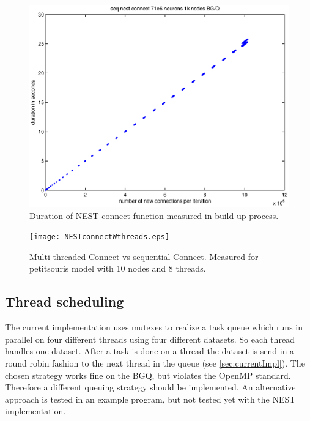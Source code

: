 \documentclass[a4paper]{article}
\begin{document}
\begin{figure}[h]
\centering
\includegraphics[scale=0.5]{seq_nest_conncet_1k.eps}
	\caption{Duration of NEST connect function measured in build-up process.}
	\label{Mikesformatcon}
\end{figure}

\begin{figure}[h]
\centering
\texttt{[image: NESTconnectWthreads.eps]}
	\caption{Multi threaded Connect vs sequential Connect.
	Measured for petitsouris model with 10 nodes and 8 threads.}
	\label{Mikesformatcon}
\end{figure}


\subsection{Thread scheduling}
The current implementation uses mutexes to realize a task queue which runs in parallel on four different threads using four different datasets. So each thread handles one dataset. After a task is done on a thread the dataset is send in a round robin fashion to the next thread in the queue (see \ref{sec:currentImpl}). The chosen strategy works fine on the BGQ, but violates the OpenMP standard.
Therefore a different queuing strategy should be implemented. An alternative approach is tested in an example program,
but not tested yet with the NEST implementation. 

\newpage
\end{document}
